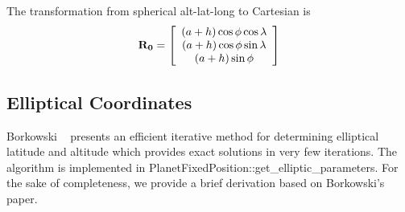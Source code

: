 \documentclass[twoside,11pt,titlepage]{report}
\begin{document}
The transformation from spherical alt-lat-long to Cartesian is
\begin{equation}
\bf{R_0} = \left[\begin{array}{c}(a+h)\cos \phi \cos \lambda \\
(a+h)\cos \phi \sin \lambda \\
(a+h)\sin \phi
\end{array}\right]
\label {sphericalToCartesian}
\end{equation}

\subsection{Elliptical Coordinates}
Borkowski ~\cite{bor} presents an efficient  iterative method for determining elliptical latitude and altitude which provides exact solutions in very few iterations.  The algorithm is implemented in PlanetFixedPosition::get\_elliptic\_parameters.  For the sake of completeness, we provide a brief derivation based on Borkowski's paper.
\end{document}
